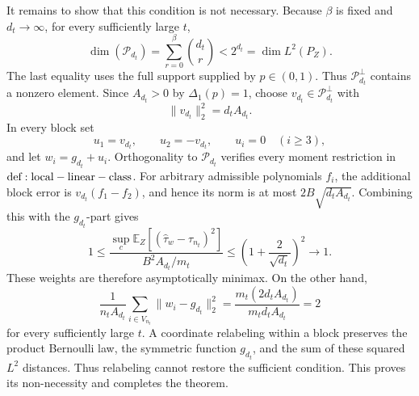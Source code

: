 It remains to show that this condition is not necessary. Because \(\beta\) is fixed and \(d_t\to\infty\), for every sufficiently large \(t\),
\[
\dim(\mathcal P_{d_t})=\sum_{r=0}^{\beta}\binom{d_t}{r}<2^{d_t}=\dim L^2(P_Z).
\]
The last equality uses the full support supplied by \(p\in(0,1)\). Thus \(\mathcal P_{d_t}^{\perp}\) contains a nonzero element. Since \(A_{d_t}>0\) by \(\Delta_1(p)=1\), choose \(v_{d_t}\in\mathcal P_{d_t}^{\perp}\) with
\[
\|v_{d_t}\|_2^2=d_tA_{d_t}.
\]
In every block set
\[
u_1=v_{d_t},\qquad u_2=-v_{d_t},\qquad u_i=0\quad(i\ge3),
\]
and let \(w_i=g_{d_t}+u_i\). Orthogonality to \(\mathcal P_{d_t}\) verifies every moment restriction in \({\rm def:local-linear-class}\). For arbitrary admissible polynomials \(f_i\), the additional block error is \(v_{d_t}(f_1-f_2)\), and hence its norm is at most \(2B\sqrt{d_tA_{d_t}}\). Combining this with the \(g_{d_t}\)-part gives
\[
1\le
\frac{\sup_c\mathbb E_Z[(\widehat\tau_w-\tau_{n_t})^2]}
{B^2A_{d_t}/m_t}
\le\left(1+\frac{2}{\sqrt{d_t}}\right)^2\longrightarrow1.
\]
These weights are therefore asymptotically minimax. On the other hand,
\[
\frac{1}{n_tA_{d_t}}\sum_{i\in V_{n_t}}
\|w_i-g_{d_t}\|_2^2
=\frac{m_t(2d_tA_{d_t})}{m_td_tA_{d_t}}=2
\]
for every sufficiently large \(t\). A coordinate relabeling within a block preserves the product Bernoulli law, the symmetric function \(g_{d_t}\), and the sum of these squared \(L^2\) distances. Thus relabeling cannot restore the sufficient condition. This proves its non-necessity and completes the theorem.